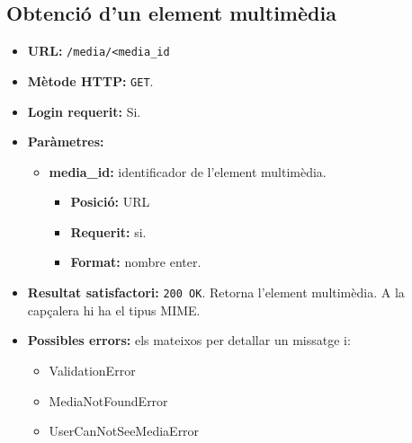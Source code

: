 \subsection{Obtenció d'un element multimèdia}
\begin{itemize}
\item \textbf{\ac{URL}:} \texttt{/media/<media\_id}
\item \textbf{Mètode \ac{HTTP}: } \texttt{GET}.
\item \textbf{Login requerit:} Si.
\item \textbf{Paràmetres:}
	\begin{itemize}
		\item \textbf{media\_id:} identificador de l'element multimèdia.
		\begin{itemize}
			\item \textbf{Posició:} \ac{URL}
			\item \textbf{Requerit:} si.
			\item \textbf{Format:} nombre enter.
		\end{itemize}
	\end{itemize}
	\item \textbf{Resultat satisfactori:} \texttt{200 OK}. Retorna l'element multimèdia. A la capçalera hi ha el tipus MIME.
	
	\item \textbf{Possibles errors:} els mateixos per detallar un missatge i:
	\begin{itemize}
		\item ValidationError
		\item MediaNotFoundError
		\item UserCanNotSeeMediaError
	\end{itemize}
\end{itemize}

